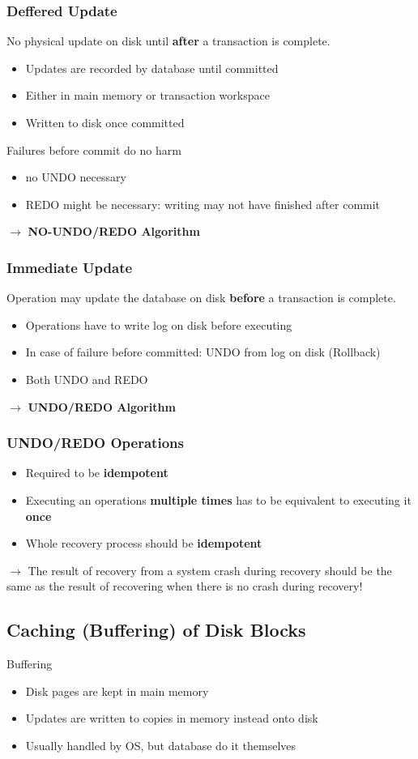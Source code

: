 \subsubsection{Deffered Update}
No physical update on disk until \textbf{after} a transaction is complete.
\begin{itemize}
	\item Updates are recorded by database until committed
	\item Either in main memory or transaction workspace
	\item Written to disk once committed
\end{itemize}
Failures before commit do no harm 
\begin{itemize}
	\item no UNDO necessary
	\item REDO might be necessary:  writing may not have finished after commit
\end{itemize}
$\rightarrow$ \textbf{NO-UNDO/REDO Algorithm} 
\subsubsection{Immediate Update}
Operation may update the database on disk \textbf{before} a transaction is complete.
\begin{itemize}
	\item Operations have to write log on disk before executing
	\item In case of failure before committed: UNDO from log on disk (Rollback)
	\item Both UNDO and REDO
\end{itemize}
$\rightarrow$ \textbf{UNDO/REDO Algorithm}
\subsubsection{UNDO/REDO Operations}
\begin{itemize}
	\item Required to be \textbf{idempotent}
	\item Executing an operations \textbf{multiple times} has to be equivalent to executing it \textbf{once}
	\item Whole recovery process should be \textbf{idempotent}
\end{itemize}
$\rightarrow$ The result of recovery from a system crash during recovery should be the same as the result of recovering when there is no crash during recovery!

\subsection{Caching (Buffering) of Disk Blocks}
Buffering
\begin{itemize}
	\item Disk pages are kept in main memory
	\item Updates are written to copies in memory instead onto disk
	\item Usually handled by OS, but database do it themselves
\end{itemize}
